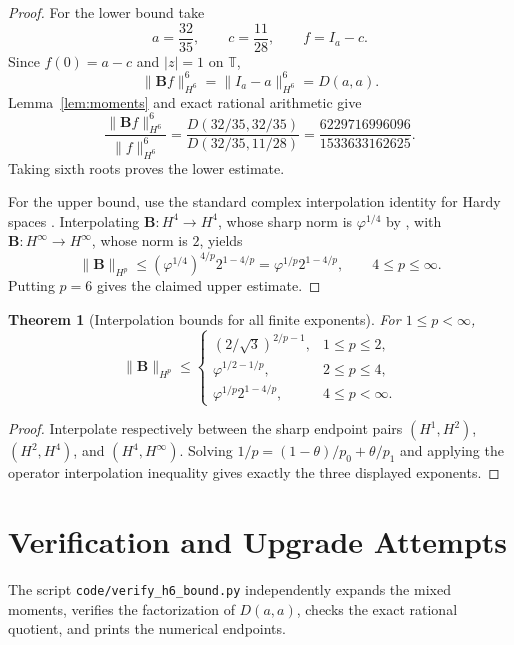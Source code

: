 \documentclass[11pt]{article}
\newtheorem{theorem}{Theorem}
\newcommand{\T}{\mathbb T}
\newcommand{\Bop}{\mathbf B}
\begin{document}
\begin{proof}
For the lower bound take
\[
 a=\frac{32}{35},\qquad c=\frac{11}{28},\qquad f=I_a-c.
\]
Since $f(0)=a-c$ and $|z|=1$ on $\T$,
\[
  \|\Bop f\|_{H^6}^6
  =\|I_a-a\|_{H^6}^6=D(a,a).
\]
Lemma~\ref{lem:moments} and exact rational arithmetic give
\[
 \frac{\|\Bop f\|_{H^6}^6}{\|f\|_{H^6}^6}
 =\frac{D(32/35,32/35)}{D(32/35,11/28)}
 =\frac{6229716996096}{1533633162625}.
\]
Taking sixth roots proves the lower estimate.

For the upper bound, use the standard complex interpolation identity for
Hardy spaces \cite[Chapter 7]{Duren}.  Interpolating $\Bop:H^4\to H^4$,
whose sharp norm is $\varphi^{1/4}$ by \cite{BL}, with
$\Bop:H^\infty\to H^\infty$, whose norm is $2$, yields
\[
 \|\Bop\|_{H^p}\le
 (\varphi^{1/4})^{4/p}2^{1-4/p}
 =\varphi^{1/p}2^{1-4/p},\qquad 4\le p\le\infty.
\]
Putting $p=6$ gives the claimed upper estimate.
\end{proof}

\begin{theorem}[Interpolation bounds for all finite exponents]
For $1\le p<\infty$,
\[
\|\Bop\|_{H^p}\le
\begin{cases}
 (2/\sqrt3)^{2/p-1},&1\le p\le2,\\[2mm]
 \varphi^{1/2-1/p},&2\le p\le4,\\[2mm]
 \varphi^{1/p}2^{1-4/p},&4\le p<\infty.
\end{cases}
\]
\end{theorem}

\begin{proof}
Interpolate respectively between the sharp endpoint pairs
$(H^1,H^2)$, $(H^2,H^4)$, and $(H^4,H^\infty)$.  Solving
$1/p=(1-\theta)/p_0+\theta/p_1$ and applying the operator interpolation
inequality gives exactly the three displayed exponents.
\end{proof}

\section*{Verification and Upgrade Attempts}

The script \texttt{code/verify\_h6\_bound.py} independently expands the mixed
moments, verifies the factorization of $D(a,a)$, checks the exact rational
quotient, and prints the numerical endpoints.
\end{document}
